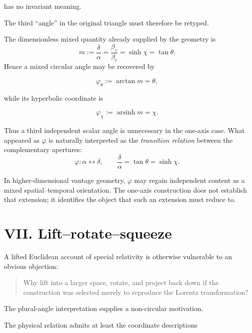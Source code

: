 \documentclass[9pt,twocolumn]{article}
\begin{document}
has no invariant meaning.

The third ``angle'' in the original triangle must therefore be retyped.

The dimensionless mixed quantity already supplied by the geometry is
\begin{equation}
m
:=
\frac{\delta}{\alpha}
=\frac{\beta_v}{\beta_c}
=\sinh\chi
=\tan\theta.
\tag{31}
\end{equation}
Hence a mixed circular angle may be recovered by

\begin{equation}
\varphi_\theta:=\arctan m=\theta,
\tag{32}
\end{equation}

while its hyperbolic coordinate is

\begin{equation}
\varphi_\chi:=\operatorname{arsinh}m=\chi.
\tag{33}
\end{equation}

Thus a third independent scalar angle is unnecessary in the one-axis case. What appeared as $\varphi$ is naturally interpreted as the \emph{transition relation} between the complementary apertures:
\begin{equation}
\boxed{
\varphi:
\alpha\leftrightarrow\delta,
\qquad
\frac{\delta}{\alpha}
=\tan\theta
=\sinh\chi.
}
\tag{34}
\end{equation}

In higher-dimensional vantage geometry, $\varphi$ may regain independent content as a mixed spatial--temporal orientation. The one-axis construction does not establish that extension; it identifies the object that such an extension must reduce to.

\section*{VII. Lift--rotate--squeeze}

A lifted Euclidean account of special relativity is otherwise vulnerable to an obvious objection:

\begin{quote}
Why lift into a larger space, rotate, and project back down if the construction was selected merely to reproduce the Lorentz transformation?
\end{quote}

The plural-angle interpretation supplies a non-circular motivation.

The physical relation admits at least the coordinate descriptions
\end{document}
